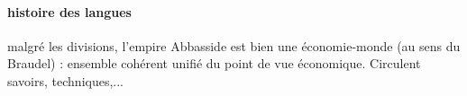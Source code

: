 \paragraph{histoire des langues} 


\begin{Synthesis}
    malgré les divisions, l'empire Abbasside est bien une économie-monde (au sens du Braudel) : ensemble cohérent unifié du point de vue économique. Circulent savoirs, techniques,...
    
\end{Synthesis}

